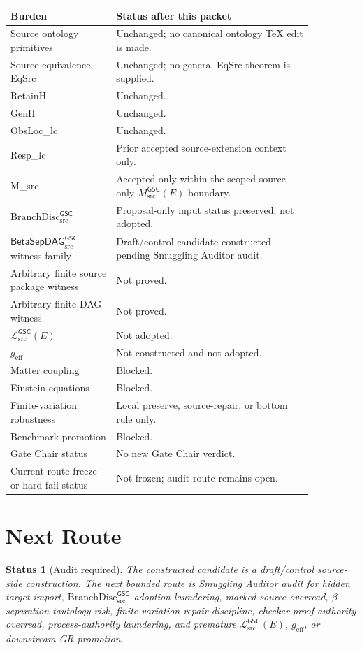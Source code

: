 \documentclass[11pt]{article}
\newcommand{\MetricData}{\mathcal{L}_{\mathrm{src}}^{\mathsf{GSC}}}
\newcommand{\geff}{g_{\mathrm{eff}}}
\newcommand{\BranchDisc}{\mathrm{BranchDisc}_{\mathrm{src}}^{\mathsf{GSC}}}
\newcommand{\BetaGraph}{\mathsf{BetaSepDAG}_{\mathrm{src}}^{\mathsf{GSC}}}
\newtheorem{status}{Status}
\begin{document}
\begin{longtable}{p{0.30\linewidth}p{0.56\linewidth}}
\toprule
Burden & Status after this packet \\
\midrule
Source ontology primitives & Unchanged; no canonical ontology TeX edit is made. \\
Source equivalence EqSrc & Unchanged; no general EqSrc theorem is supplied. \\
RetainH & Unchanged. \\
GenH & Unchanged. \\
ObsLoc\_lc & Unchanged. \\
Resp\_lc & Prior accepted source-extension context only. \\
M\_src & Accepted only within the scoped source-only \(M_{\mathrm{src}}^{\mathsf{GSC}}(E)\) boundary. \\
\(\BranchDisc\) & Proposal-only input status preserved; not adopted. \\
\(\BetaGraph\) witness family & Draft/control candidate constructed pending Smuggling Auditor audit. \\
Arbitrary finite source package witness & Not proved. \\
Arbitrary finite DAG witness & Not proved. \\
\(\MetricData(E)\) & Not adopted. \\
\(\geff\) & Not constructed and not adopted. \\
Matter coupling & Blocked. \\
Einstein equations & Blocked. \\
Finite-variation robustness & Local preserve, source-repair, or bottom rule only. \\
Benchmark promotion & Blocked. \\
Gate Chair status & No new Gate Chair verdict. \\
Current route freeze or hard-fail status & Not frozen; audit route remains open. \\
\bottomrule
\end{longtable}

\section{Next Route}

\begin{status}[Audit required]
The constructed candidate is a draft/control source-side construction. The
next bounded route is Smuggling Auditor audit for hidden target import,
\(\BranchDisc\) adoption laundering, marked-source overread,
\(\beta\)-separation tautology risk, finite-variation repair discipline,
checker proof-authority overread, process-authority laundering, and premature
\(\MetricData(E)\), \(\geff\), or downstream GR promotion.
\end{status}
\end{document}
